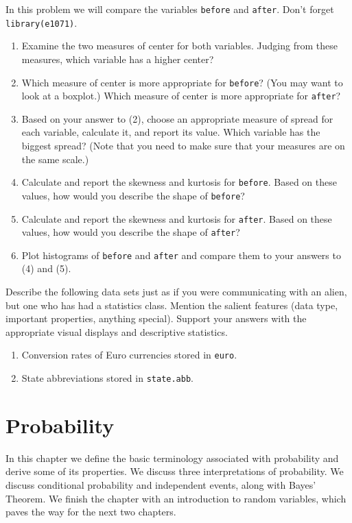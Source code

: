 \documentclass[captions=tableheading]{scrbook}
\begin{document}
\begin{xca}
In this problem we will compare the variables \texttt{before} and \texttt{after}. Don't forget \texttt{library(e1071)}.
\begin{enumerate}
\item Examine the two measures of center for both variables. Judging from these measures, which variable has a higher center?
\item Which measure of center is more appropriate for \texttt{before}? (You may want to look at a boxplot.) Which measure of center is more appropriate for \texttt{after}?
\item Based on your answer to (2), choose an appropriate measure of spread for each variable, calculate it, and report its value. Which variable has the biggest spread? (Note that you need to make sure that your measures are on the same scale.)
\item Calculate and report the skewness and kurtosis for \texttt{before}. Based on these values, how would you describe the shape of \texttt{before}?
\item Calculate and report the skewness and kurtosis for \texttt{after}. Based on these values, how would you describe the shape of \texttt{after}?
\item Plot histograms of \texttt{before} and \texttt{after} and compare them to your answers to (4) and (5).
\end{enumerate}
\end{xca}

\begin{xca}
Describe the following data sets just as if you were communicating with an alien, but one who has had a statistics class. Mention the salient features (data type, important properties, anything special). Support your answers with the appropriate visual displays and descriptive statistics.
\begin{enumerate}
\item Conversion rates of Euro currencies stored in \texttt{euro}.
\item State abbreviations stored in \texttt{state.abb}.
\end{enumerate}
\end{xca}
\chapter{Probability}
\label{sec-3}

\label{cha:Probability}


\noindent 
In this chapter we define the basic terminology associated with probability and derive some of its properties. We discuss three interpretations of probability. We discuss conditional probability and independent events, along with Bayes' Theorem. We finish the chapter with an introduction to random variables, which paves the way for the next two chapters.
\end{document}
